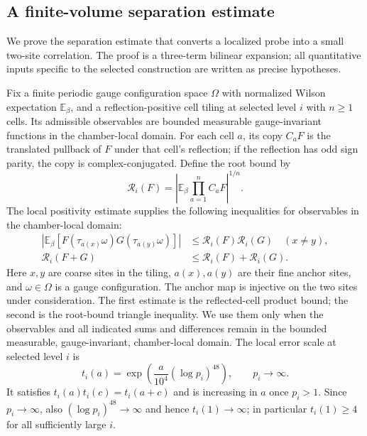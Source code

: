 \subsection{A finite-volume separation estimate}
\label{sec:ex-lattice-trace-local-pairing}

We prove the separation estimate that converts a localized probe into a
small two-site correlation. The proof is a three-term bilinear expansion;
all quantitative inputs specific to the selected construction are written
as precise hypotheses.

Fix a finite periodic gauge configuration space $\Omega$ with normalized
Wilson expectation $\mathbb E_\beta$, and a reflection-positive cell
tiling at selected level $i$ with $n\ge1$ cells. Its admissible
observables are bounded measurable gauge-invariant functions in the
chamber-local domain. For each cell $a$, its copy $C_aF$ is the
translated pullback of $F$ under that cell's reflection; if the reflection
has odd sign parity, the copy is complex-conjugated. Define the root bound
by
\[
 \mathcal R_i(F)=\left|\mathbb E_\beta\prod_{a=1}^n C_aF\right|^{1/n}.
\]
The local positivity estimate supplies the following inequalities for
observables in the chamber-local domain:
\begin{align}
 |\mathbb E_\beta[F(\tau_{a(x)}\omega)G(\tau_{a(y)}\omega)]|
    &\le \mathcal R_i(F)\mathcal R_i(G)\quad(x\ne y),
    \label{eq:ex-lattice-root-product}\\
 \mathcal R_i(F+G)&\le\mathcal R_i(F)+\mathcal R_i(G).
    \label{eq:ex-lattice-root-sum}
\end{align}
Here $x,y$ are coarse sites in the tiling, $a(x),a(y)$ are their fine
anchor sites, and $\omega\in\Omega$ is a gauge configuration. The anchor
map is injective on the two sites under consideration. The first estimate
is the reflected-cell product bound; the second is the root-bound triangle
inequality. We use them only when the observables and all indicated sums
and differences remain in the bounded measurable, gauge-invariant,
chamber-local domain.
The local error scale at selected level $i$ is
\[
 t_i(a)=\exp\!\left(\frac{a}{10^4}(\log p_i)^{48}\right),
 \qquad p_i\longrightarrow\infty.
\]
It satisfies $t_i(a)t_i(c)=t_i(a+c)$ and is increasing in $a$ once $p_i>1$.
Since $p_i\to\infty$, also $(\log p_i)^{48}\to\infty$ and hence
$t_i(1)\to\infty$; in particular $t_i(1)\ge4$ for all sufficiently large
$i$.

